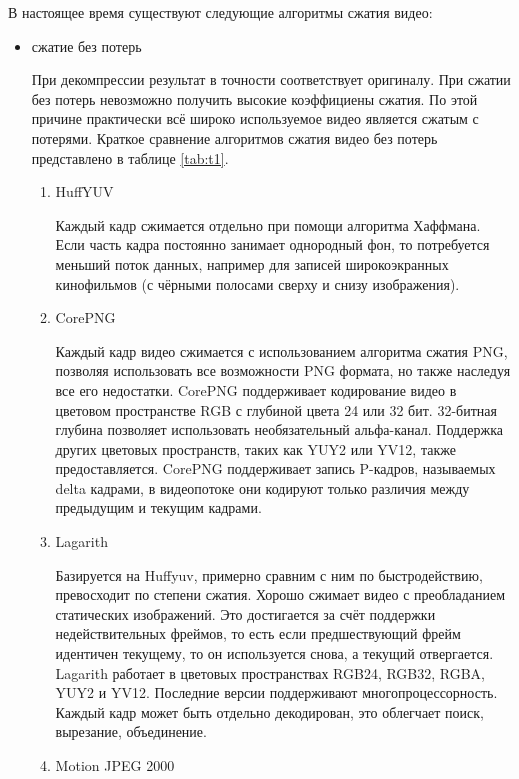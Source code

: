 В настоящее время существуют следующие алгоритмы сжатия видео:
\begin{itemize}
\item сжатие без потерь

При декомпрессии результат в точности соответствует оригиналу. При сжатии без потерь 
невозможно получить высокие коэффициены сжатия. По этой причине практически всё
широко используемое видео является сжатым с потерями. Краткое сравнение алгоритмов сжатия видео без потерь представлено в таблице \ref{tab:t1}.

\begin{enumerate}
\item HuffYUV

Каждый кадр сжимается отдельно при помощи алгоритма Хаффмана. 
Если часть кадра постоянно занимает однородный фон, то потребуется меньший поток данных, 
например для записей широкоэкранных кинофильмов (с чёрными полосами сверху и снизу изображения). 

\item CorePNG

Каждый кадр видео сжимается с использованием алгоритма сжатия PNG, позволяя 
использовать все возможности PNG формата, но также наследуя все его недостатки.
CorePNG поддерживает кодирование видео в цветовом пространстве RGB с глубиной 
цвета 24 или 32 бит. 32-битная глубина позволяет использовать необязательный 
альфа-канал. Поддержка других цветовых пространств, таких как YUY2 или YV12, также предоставляется.
CorePNG поддерживает запись P-кадров, называемых delta кадрами, в видеопотоке они 
кодируют только различия между предыдущим и текущим кадрами. 

\item Lagarith

Базируется на Huffyuv, примерно сравним с ним по быстродействию, превосходит по степени сжатия. 
Хорошо сжимает видео с преобладанием статических изображений. Это достигается 
за счёт поддержки недействительных фреймов, то есть если предшествующий фрейм 
идентичен текущему, то он используется снова, а текущий отвергается.
Lagarith работает в цветовых пространствах RGB24, RGB32, RGBA, YUY2 и YV12.
Последние версии поддерживают многопроцессорность. 
Каждый кадр может быть отдельно декодирован, это облегчает поиск, вырезание, объединение.

\item Motion JPEG 2000 


\end{enumerate}
\end{itemize}

